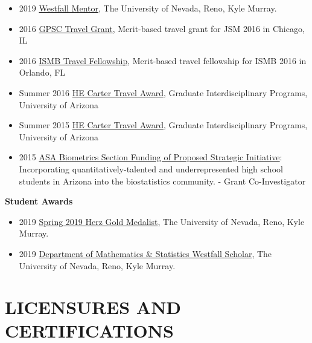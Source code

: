 \documentclass[paper=a4,fontsize=11pt]{scrartcl} %
\newcommand{\NewPart}[2]{\section*{\uppercase{#1} #2 }}
\begin{document}
\begin{itemize}[noitemsep]
    \item 2019 \href{https://www.unr.edu/science/student-resources/student-competitions-awards}{Westfall Mentor}, The University of Nevada, Reno, Kyle Murray.
\item 2016 \href{http://gpsc.arizona.edu/travel-grants}{GPSC Travel Grant}, Merit-based travel grant for JSM 2016 in Chicago, IL
\item 2016 \href{https://www.iscb.org/ismb2016-submission/ismb2016-travel-fellowship-2}{ISMB Travel Fellowship}, Merit-based travel fellowship for ISMB 2016 in Orlando, FL
\item Summer 2016 \href{https://gidp.arizona.edu/carter-travel-award/award-recipients}{HE Carter Travel Award}, Graduate Interdisciplinary Programs, University of Arizona 
\item Summer 2015 \href{https://gidp.arizona.edu/carter-travel-award/award-recipients}{HE Carter Travel Award}, Graduate Interdisciplinary Programs, University of Arizona 
\item 2015 \href{http://stattrak.amstat.org/2014/03/01/grant-opportunity}{ASA Biometrics Section Funding of Proposed Strategic Initiative}:  Incorporating quantitatively-talented and underrepresented high school students in Arizona into the biostatistics community. - Grant Co-Investigator
\end{itemize}

\textbf{Student Awards}

\begin{itemize}[noitemsep]
\item 2019 \href{https://www.unr.edu/nevada-today/news/2019/spring-2019-herz-gold-medalist?utm_source=newsletter051619&utm_medium=email&utm_content=kylemurray&utm_campaign=NevadaWeekly}{Spring 2019 Herz Gold Medalist}, The University of Nevada, Reno, Kyle Murray.
  \item 2019 \href{https://www.unr.edu/science/student-resources/student-competitions-awards}{Department of Mathematics \& Statistics Westfall Scholar}, The University of Nevada, Reno, Kyle Murray.

\vspace{-7pt}
\end{itemize}  



\NewPart{Licensures and Certifications}{}
\vspace{-7pt}
\end{document}
